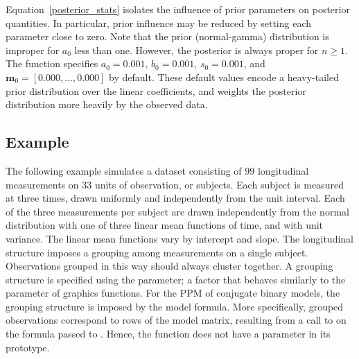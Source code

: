 \documentclass[article, nojss]{jss}
\newcommand{\bm}{\boldsymbol{m}}
\begin{document}
Equation~\ref{posterior_stats} isolates the influence of prior parameters on posterior quantities. In particular, prior influence may be reduced by setting each parameter close to zero. Note that the prior (normal-gamma) distribution is improper for $a_0$ less than one. However, the posterior is always proper for $n \geq 1$. The  function specifies $a_0 = 0.001$, $b_0 = 0.001$, $s_0 = 0.001$, and $\bm_0 = [0.000,\ldots,0.000]$ by default. These default values encode a heavy-tailed prior distribution over the linear coefficients, and weights the posterior distribution more heavily by the observed data. 

\subsection[Example]{ Example}

The following example simulates a dataset consisting of $99$ longitudinal measurements on $33$ units of observation, or subjects. Each subject is measured at three times, drawn uniformly and independently from the unit interval. Each of the three measurements per subject are drawn independently from the normal distribution with one of three linear mean functions of time, and with unit variance. The linear mean functions vary by intercept and slope. The longitudinal structure imposes a grouping among measurements on a single subject. Observations grouped in this way should always cluster together. A grouping structure is specified using the  parameter; a factor that behaves similarly to the  parameter of  graphics functions. For the PPM of conjugate binary models, the grouping structure is imposed by the model formula. More specifically, grouped observations correspond to rows of the model matrix, resulting from a call to  on the formula passed to . Hence, the  function does not have a  parameter in its prototype.
\end{document}

